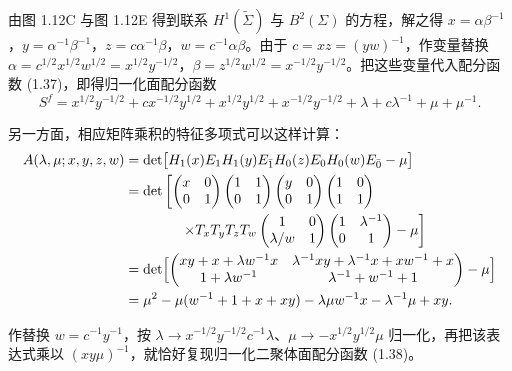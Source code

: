 由图 1.12C 与图 1.12E 得到联系 $H^1(\tilde\Sigma)$ 与 $B^2(\Sigma)$ 的方程，解之得 $x=\alpha\beta^{-1}$，$y=\alpha^{-1}\beta^{-1}$，$z=c\alpha^{-1}\beta$，$w=c^{-1}\alpha\beta$。由于 $c=xz=(yw)^{-1}$，作变量替换 $\alpha=c^{1/2}x^{1/2}w^{1/2}=x^{1/2}y^{-1/2}$，$\beta=z^{1/2}w^{1/2}=x^{-1/2}y^{-1/2}$。把这些变量代入配分函数 (1.37)，即得归一化面配分函数
\begin{equation}
S^f=x^{1/2}y^{-1/2}+cx^{-1/2}y^{1/2}+x^{1/2}y^{1/2}+x^{-1/2}y^{-1/2}+\lambda+c\lambda^{-1}+\mu+\mu^{-1}.
\tag{1.38}\label{eq:1.38}
\end{equation}

另一方面，相应矩阵乘积的特征多项式可以这样计算：
\[
\begin{aligned}
A(\lambda,\mu;x,y,z,w)&=\det\bigl[H_1(x)E_1H_1(y)E_{\bar1}H_0(z)E_0H_0(w)E_{\bar0}-\mu\bigr]\\
&= \det\left[\begin{pmatrix}x&0\\0&1\end{pmatrix}
\begin{pmatrix}1&1\\0&1\end{pmatrix}
\begin{pmatrix}y&0\\0&1\end{pmatrix}
\begin{pmatrix}1&0\\1&1\end{pmatrix}\right.\\
&\qquad\qquad\left.\times T_xT_yT_zT_w
\begin{pmatrix}1&0\\ \lambda/w&1\end{pmatrix}
\begin{pmatrix}1&\lambda^{-1}\\0&1\end{pmatrix}
-\mu\right]\\
&=\det\Bigl[\begin{pmatrix}
xy+x+\lambda w^{-1}x&\lambda^{-1}xy+\lambda^{-1}x+xw^{-1}+x\\
1+\lambda w^{-1}&\lambda^{-1}+w^{-1}+1
\end{pmatrix}-\mu\Bigr]\\
&=\mu^2-\mu(w^{-1}+1+x+xy)-\lambda\mu w^{-1}x-\lambda^{-1}\mu+xy.
\end{aligned}
\]

作替换 $w=c^{-1}y^{-1}$，按 $\lambda\to x^{-1/2}y^{-1/2}c^{-1}\lambda$、$\mu\to-x^{1/2}y^{1/2}\mu$ 归一化，再把该表达式乘以 $(xy\mu)^{-1}$，就恰好复现归一化二聚体面配分函数 (1.38)。


